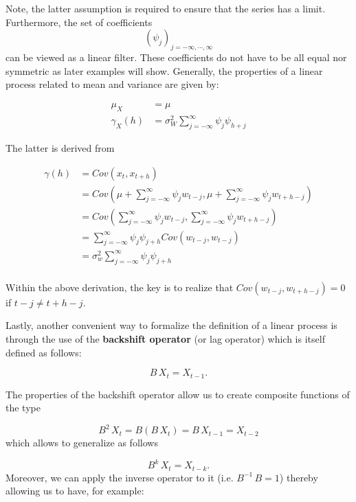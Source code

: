 \documentclass[]{book}
\theoremstyle{definition}
\theoremstyle{definition}
\theoremstyle{definition}
\theoremstyle{remark}
\begin{document}
Note, the latter assumption is required to ensure that the series has a
limit. Furthermore, the set of coefficients
\[{( {\psi _j}) _{j =  - \infty , \cdots ,\infty }}\] can be viewed as a
linear filter. These coefficients do not have to be all equal nor
symmetric as later examples will show. Generally, the properties of a
linear process related to mean and variance are given by:

\[\begin{aligned}
\mu_{X} &= \mu \\
\gamma_{X}(h) &= \sigma _W^2\sum\limits_{j =  - \infty }^\infty  {{\psi _j}{\psi _{h + j}}}
\end{aligned}\]

The latter is derived from

\[\begin{aligned}
  \gamma \left( h \right) &= Cov\left( {{x_t},{x_{t + h}}} \right) \\
   &= Cov\left( {\mu  + \sum\limits_{j =  - \infty }^\infty  {{\psi _j}{w_{t - j}}} ,\mu  + \sum\limits_{j =  - \infty }^\infty  {{\psi _j}{w_{t + h - j}}} } \right) \\
   &= Cov\left( {\sum\limits_{j =  - \infty }^\infty  {{\psi _j}{w_{t - j}}} ,\sum\limits_{j =  - \infty }^\infty  {{\psi _j}{w_{t + h - j}}} } \right) \\
   &= \sum\limits_{j =  - \infty }^\infty  {{\psi _j}{\psi _{j + h}}Cov\left( {{w_{t - j}},{w_{t - j}}} \right)}  \\
   &= \sigma _w^2\sum\limits_{j =  - \infty }^\infty  {{\psi _j}{\psi _{j + h}}}  \\ 
\end{aligned} \]

Within the above derivation, the key is to realize that
\(Cov\left( {{w_{t - j}},{w_{t + h - j}}} \right) = 0\) if
\(t - j \ne t + h - j\).

Lastly, another convenient way to formalize the definition of a linear
process is through the use of the \textbf{backshift operator} (or lag
operator) which is itself defined as follows:

\[B\,X_t = X_{t-1}.\]

The properties of the backshift operator allow us to create composite
functions of the type

\[B^2 \, X_t = B (B \, X_t) = B \, X_{t-1} = X_{t-2}\] which allows to
generalize as follows

\[B^k \, X_t = X_{t-k}.\] Moreover, we can apply the inverse operator to
it (i.e. \(B^{-1} \, B = 1\)) thereby allowing us to have, for example:
\end{document}
